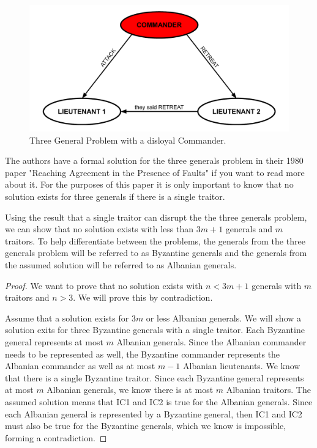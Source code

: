 \documentclass[10pt]{amsart}
\begin{document}
\begin{figure}[h!]
    \centering
    \includegraphics[scale=.6]{../figures/three_generals_unloyal_commander.pdf}
    \caption{Three General Problem with a disloyal Commander.}
    \label{fig:3gen_comm}
\end{figure}

The authors have a formal solution for the three generals problem in their 1980 paper "Reaching 
Agreement in the Presence of Faults" if you want to read more about it. For the purposes of this
paper it is only important to know that no solution exists for three generals if there is a single
traitor.

Using the result that a single traitor can disrupt the the three generals problem, we can show that
no solution exists with less than $3m+1$ generals and $m$ traitors. To help differentiate between
the problems, the generals from the three generals problem will be referred to as Byzantine generals
and the generals from the assumed solution will be referred to as Albanian generals.

\begin{proof}
    We want to prove that no solution exists with $n < 3m + 1$ generals with $m$ traitors and $n > 3$.
    We will prove this by contradiction. 

    Assume that a solution exists for $3m$ or less Albanian generals. We will show a solution exits
    for three Byzantine generals with a single traitor. Each Byzantine general represents at most 
    $m$ Albanian generals. Since the Albanian commander needs to be represented as well, the
    Byzantine commander represents the Albanian commander as well as at most $m-1$ Albanian lieutenants.
    We know that there is a single Byzantine traitor. Since each Byzantine general represents at
    most $m$ Albanian generals, we know there is at most $m$ Albanian traitors. The assumed solution
    means that IC1 and IC2 is true for the Albanian generals. Since each Albanian general is 
    represented by a Byzantine general, then IC1 and IC2 must also be true for the Byzantine generals,
    which we know is impossible, forming a contradiction.
\end{proof}
\end{document}
